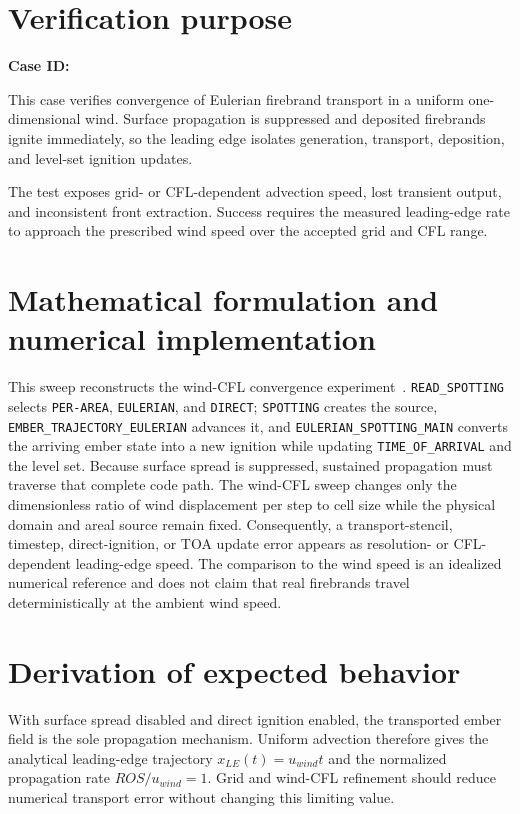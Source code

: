 \section{Verification purpose}

\textbf{Case ID:} \CaseID

This case verifies convergence of Eulerian firebrand transport in a uniform one-dimensional wind. Surface propagation is suppressed and deposited firebrands ignite immediately, so the leading edge isolates generation, transport, deposition, and level-set ignition updates.

The test exposes grid- or CFL-dependent advection speed, lost transient output, and inconsistent front extraction. Success requires the measured leading-edge rate to approach the prescribed wind speed over the accepted grid and CFL range.

\section{Mathematical formulation and numerical implementation}

\begin{sloppypar}
This sweep reconstructs the wind-CFL convergence experiment~\cite{Qin2025}. \texttt{READ\_SPOTTING} selects \texttt{PER-AREA}, \texttt{EULERIAN}, and \texttt{DIRECT}; \texttt{SPOTTING} creates the source, \texttt{EMBER\_\allowbreak TRAJECTORY\_\allowbreak EULERIAN} advances it, and \texttt{EULERIAN\_\allowbreak SPOTTING\_\allowbreak MAIN} converts the arriving ember state into a new ignition while updating \texttt{TIME\_\allowbreak OF\_\allowbreak ARRIVAL} and the level set. Because surface spread is suppressed, sustained propagation must traverse that complete code path. The wind-CFL sweep changes only the dimensionless ratio of wind displacement per step to cell size while the physical domain and areal source remain fixed. Consequently, a transport-stencil, timestep, direct-ignition, or TOA update error appears as resolution- or CFL-dependent leading-edge speed. The comparison to the wind speed is an idealized numerical reference and does not claim that real firebrands travel deterministically at the ambient wind speed.

\end{sloppypar}

\section{Derivation of expected behavior}
With surface spread disabled and direct ignition enabled, the transported ember field is the sole propagation mechanism. Uniform advection therefore gives the analytical leading-edge trajectory $x_{LE}(t)=u_{wind}t$ and the normalized propagation rate $ROS/u_{wind}=1$. Grid and wind-CFL refinement should reduce numerical transport error without changing this limiting value.

